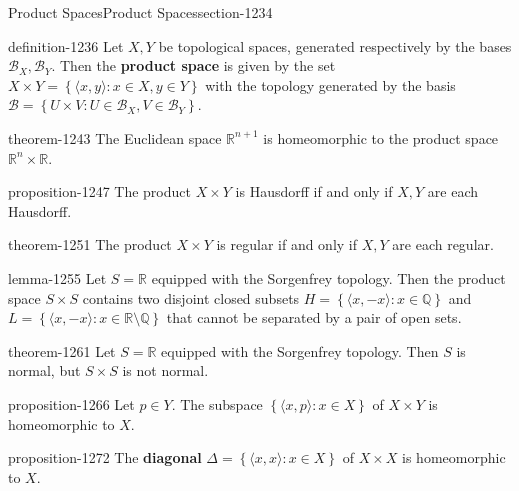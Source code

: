 \documentclass[oneside,10pt,]{article}
\newcommand{\terminology}[1]{\textbf{#1}}
\newcommand{\tuple}[1]{\langle #1 \rangle}
\newcommand{\mb}{\mathbb}
\newcommand{\mc}{\mathcal}
\newcommand{\setBuilder}[2]{\left\{#1:#2\right\}}
\begin{document}
%
%
\typeout{************************************************}
\typeout{************************************************}
%
\begin{sectionptx}{Product Spaces}{}{Product Spaces}{}{}{section-1234}
\begin{definition}{}{definition-1236}%
\hypertarget{p-1237}{}%
Let \(X,Y\) be topological spaces, generated respectively by the bases \(\mc B_X,\mc B_Y\). Then the \terminology{product space} is given by the set \(X\times Y=\setBuilder{\tuple{x,y}}{x\in X,y\in Y}\) with the topology generated by the basis \(\mc B=\setBuilder{U\times V}{U\in\mc B_X,V\in\mc B_Y}\).%
\end{definition}
\begin{theorem}{}{}{theorem-1243}%
\hypertarget{p-1244}{}%
The Euclidean space \(\mb R^{n+1}\) is homeomorphic to the product space \(\mb R^n\times\mb R\).%
\end{theorem}
\begin{proposition}{}{}{proposition-1247}%
\hypertarget{p-1248}{}%
The product \(X\times Y\) is Hausdorff if and only if \(X,Y\) are each Hausdorff.%
\end{proposition}
\begin{theorem}{}{}{theorem-1251}%
\hypertarget{p-1252}{}%
The product \(X\times Y\) is regular if and only if \(X,Y\) are each regular.%
\end{theorem}
\begin{lemma}{}{}{lemma-1255}%
\hypertarget{p-1256}{}%
Let \(S=\mb R\) equipped with the Sorgenfrey topology. Then the product space \(S\times S\) contains two disjoint closed subsets \(H=\setBuilder{\tuple{x,-x}}{x\in\mb Q}\) and \(L=\setBuilder{\tuple{x,-x}}{x\in\mb R\setminus\mb Q}\) that cannot be separated by a pair of open sets.%
\end{lemma}
\begin{theorem}{}{}{theorem-1261}%
\hypertarget{p-1262}{}%
Let \(S=\mb R\) equipped with the Sorgenfrey topology. Then \(S\) is normal, but \(S\times S\) is not normal.%
\end{theorem}
\begin{proposition}{}{}{proposition-1266}%
\hypertarget{p-1267}{}%
Let \(p\in Y\). The subspace \(\setBuilder{\tuple{x,p}}{x\in X}\) of \(X\times Y\) is homeomorphic to \(X\).%
\end{proposition}
\begin{proposition}{}{}{proposition-1272}%
\hypertarget{p-1273}{}%
The \terminology{diagonal} \(\Delta=\setBuilder{\tuple{x,x}}{x\in X}\) of \(X\times X\) is homeomorphic to \(X\).%

\end{proposition}
\end{sectionptx}
\end{document}
